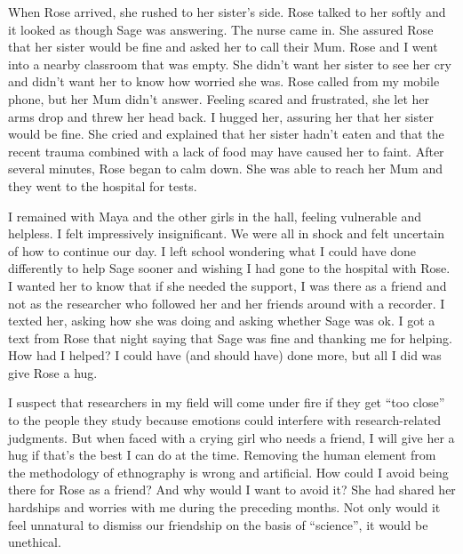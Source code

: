 \largerpage
When Rose arrived, she rushed to her sister's side. Rose talked to her softly and it looked as though Sage was answering. The nurse came in. She assured Rose that her sister would be fine and asked her to call their Mum. Rose and I went into a nearby classroom that was empty. She didn't want her sister to see her cry and didn't want her to know how worried she was. Rose called from my mobile phone, but her Mum didn't answer. Feeling scared and frustrated, she let her arms drop and threw her head back. I hugged her, assuring her that her sister would be fine. She cried and explained that her sister hadn't eaten and that the recent trauma combined with a lack of food may have caused her to faint. After several minutes, Rose began to calm down. She was able to reach her Mum and they went to the hospital for tests. 

I remained with Maya and the other girls in the hall, feeling vulnerable and helpless. I felt impressively insignificant. We were all in shock and felt uncertain of how to continue our day. I left school wondering what I could have done differently to help Sage sooner and wishing I had gone to the hospital with Rose. I wanted her to know that if she needed the support, I was there as a friend and not as the researcher who followed her and her friends around with a recorder. I texted her, asking how she was doing and asking whether Sage was ok. I got a text from Rose that night saying that Sage was fine and thanking me for helping. How had I helped?  I could have (and should have) done more, but all I did was give Rose a hug. 

I suspect that researchers in my field will come under fire if they get ``too close'' to the people they study because emotions could interfere with research-related judgments. But when faced with a crying girl who needs a friend, I will give her a hug if that's the best I can do at the time. Removing the human element from the methodology of ethnography is wrong and artificial.   How could I avoid being there for Rose as a friend?  And why would I want to avoid it?  She had shared her hardships and worries with me during the preceding months. Not only would it feel unnatural to dismiss our friendship on the basis of ``science'', it would be unethical.


